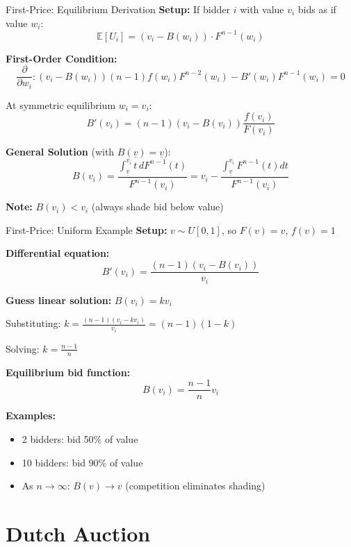 \documentclass[xcolor={x11names}, aspectratio=169 ]{beamer}
\newcommand{\E}{\mathbb{E}}
\begin{document}
\begin{frame}{First-Price: Equilibrium Derivation}
\textbf{Setup:} If bidder $i$ with value $v_i$ bids as if value $w_i$:
$$\E[U_i] = (v_i - B(w_i)) \cdot F^{n-1}(w_i)$$

\textbf{First-Order Condition:}
$$\frac{\partial}{\partial w_i}: (v_i - B(w_i))(n-1)f(w_i)F^{n-2}(w_i) - B'(w_i)F^{n-1}(w_i) = 0$$

At symmetric equilibrium $w_i = v_i$:
$$B'(v_i) = (n-1)(v_i - B(v_i))\frac{f(v_i)}{F(v_i)}$$

\textbf{General Solution} (with $B(\underline{v}) = \underline{v}$):
$$B(v_i) = \frac{\int_{\underline{v}}^{v_i} t \, dF^{n-1}(t)}{F^{n-1}(v_i)} = v_i - \frac{\int_{\underline{v}}^{v_i} F^{n-1}(t)dt}{F^{n-1}(v_i)}$$

\textbf{Note:} $B(v_i) < v_i$ (always shade bid below value)
\end{frame}

\begin{frame}{First-Price: Uniform Example}
\textbf{Setup:} $v \sim U[0,1]$, so $F(v) = v$, $f(v) = 1$

\textbf{Differential equation:}
$$B'(v_i) = \frac{(n-1)(v_i - B(v_i))}{v_i}$$

\textbf{Guess linear solution:} $B(v_i) = kv_i$

Substituting: $k = \frac{(n-1)(v_i - kv_i)}{v_i} = (n-1)(1-k)$

Solving: $k = \frac{n-1}{n}$

\textbf{Equilibrium bid function:}
$$\boxed{B(v_i) = \frac{n-1}{n} v_i}$$

\textbf{Examples:}
\begin{itemize}
  \item 2 bidders: bid 50\% of value
  \item 10 bidders: bid 90\% of value  
  \item As $n \to \infty$: $B(v) \to v$ (competition eliminates shading)
\end{itemize}
\end{frame}

\section{Dutch Auction}
\end{document}
